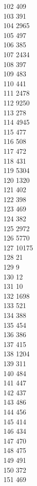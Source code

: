 { 102	409 \\
 103	391 \\
 104	2965 \\
 105	497 \\
 106	385 \\
 107	2434 \\
 108	397 \\
 109	483 \\
 110	441 \\
 111	2478 \\
 112	9250 \\
 113	278 \\
 114	4945 \\
 115	477 \\
 116	508 \\
 117	472 \\
 118	431 \\
 119	5304 \\
 120	1320 \\
 121	402 \\
 122	398 \\
 123	469 \\
 124	382 \\
 125	2972 \\
 126	5770 \\
 127	10175 \\
 128	21 \\
 129	9 \\
 130	12 \\
 131	10 \\
 132	1698 \\
 133	521 \\
 134	388 \\
 135	454 \\
 136	386 \\
 137	415 \\
 138	1204 \\
 139	311 \\
 140	484 \\
 141	447 \\
 142	437 \\
 143	486 \\
 144	456 \\
 145	414 \\
 146	434 \\
 147	470 \\
 148	475 \\
 149	491 \\
 150	372 \\
 151	469 \\
}
